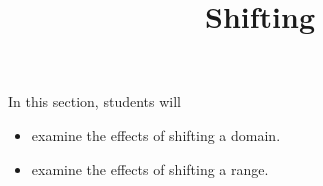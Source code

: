 \documentclass{ximera}
\title{Shifting}
\begin{document}
\begin{abstract}
\end{abstract}
\maketitle



















\begin{sectionOutcomes}
In this section, students will 

\begin{itemize}
\item examine the effects of shifting a domain.
\item examine the effects of shifting a range.
\end{itemize}
\end{sectionOutcomes}
\end{document}
